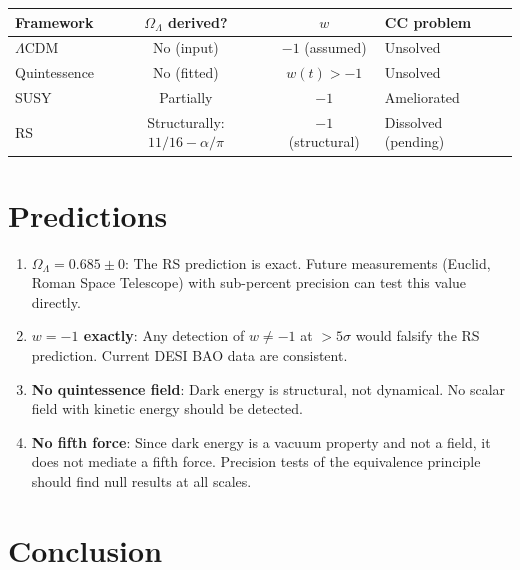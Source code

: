 \documentclass[12pt,a4paper]{article}
\theoremstyle{definition}
\theoremstyle{remark}
\begin{document}
\begin{center}
\renewcommand{\arraystretch}{1.3}
\begin{tabular}{lccl}
\toprule
\textbf{Framework} & \textbf{$\Omega_\Lambda$ derived?} &
\textbf{$w$} & \textbf{CC problem} \\
\midrule
$\Lambda$CDM & No (input) & $-1$ (assumed) & Unsolved \\
Quintessence & No (fitted) & $w(t) > -1$ & Unsolved \\
SUSY & Partially & $-1$ & Ameliorated \\
RS & Structurally: $11/16 - \alpha/\pi$ & $-1$ (structural) & Dissolved (pending) \\
\bottomrule
\end{tabular}
\end{center}

\section{Predictions}
\label{sec:predictions}

\begin{enumerate}
  \item \textbf{$\Omega_\Lambda = 0.685 \pm 0$}: The RS prediction
  is exact.  Future measurements (Euclid, Roman Space Telescope) with
  sub-percent precision can test this value directly.

  \item \textbf{$w = -1$ exactly}: Any detection of $w \neq -1$ at
  $> 5\sigma$ would falsify the RS prediction.  Current DESI BAO
  data are consistent.

  \item \textbf{No quintessence field}: Dark energy is structural,
  not dynamical.  No scalar field with kinetic energy should be
  detected.

  \item \textbf{No fifth force}: Since dark energy is a vacuum
  property and not a field, it does not mediate a fifth force.
  Precision tests of the equivalence principle should find null
  results at all scales.
\end{enumerate}

\section{Conclusion}
\label{sec:conclusion}
\end{document}
